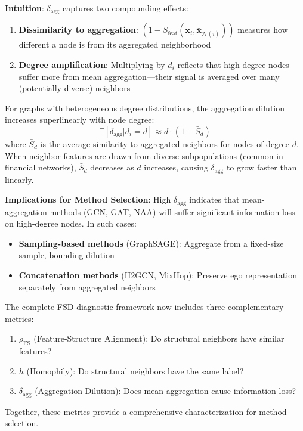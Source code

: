 \textbf{Intuition}: $\delta_{\text{agg}}$ captures two compounding effects:
\begin{enumerate}
    \item \textbf{Dissimilarity to aggregation}: $(1 - S_{\text{feat}}(\mathbf{x}_i, \bar{\mathbf{x}}_{\mathcal{N}(i)}))$ measures how different a node is from its aggregated neighborhood
    \item \textbf{Degree amplification}: Multiplying by $d_i$ reflects that high-degree nodes suffer more from mean aggregation---their signal is averaged over many (potentially diverse) neighbors
\end{enumerate}

\begin{proposition}
\label{prop:degree_dilution}
For graphs with heterogeneous degree distributions, the aggregation dilution increases superlinearly with node degree:
\begin{equation}
\mathbb{E}[\delta_{\text{agg}} | d_i = d] \approx d \cdot (1 - \bar{S}_d)
\end{equation}
where $\bar{S}_d$ is the average similarity to aggregated neighbors for nodes of degree $d$. When neighbor features are drawn from diverse subpopulations (common in financial networks), $\bar{S}_d$ decreases as $d$ increases, causing $\delta_{\text{agg}}$ to grow faster than linearly.
\end{proposition}

\textbf{Implications for Method Selection}: High $\delta_{\text{agg}}$ indicates that mean-aggregation methods (GCN, GAT, NAA) will suffer significant information loss on high-degree nodes. In such cases:
\begin{itemize}
    \item \textbf{Sampling-based methods} (GraphSAGE): Aggregate from a fixed-size sample, bounding dilution
    \item \textbf{Concatenation methods} (H2GCN, MixHop): Preserve ego representation separately from aggregated neighbors
\end{itemize}

\begin{remark}
The complete FSD diagnostic framework now includes three complementary metrics:
\begin{enumerate}
    \item $\rho_{\text{FS}}$ (Feature-Structure Alignment): Do structural neighbors have similar features?
    \item $h$ (Homophily): Do structural neighbors have the same label?
    \item $\delta_{\text{agg}}$ (Aggregation Dilution): Does mean aggregation cause information loss?
\end{enumerate}
Together, these metrics provide a comprehensive characterization for method selection.
\end{remark}

